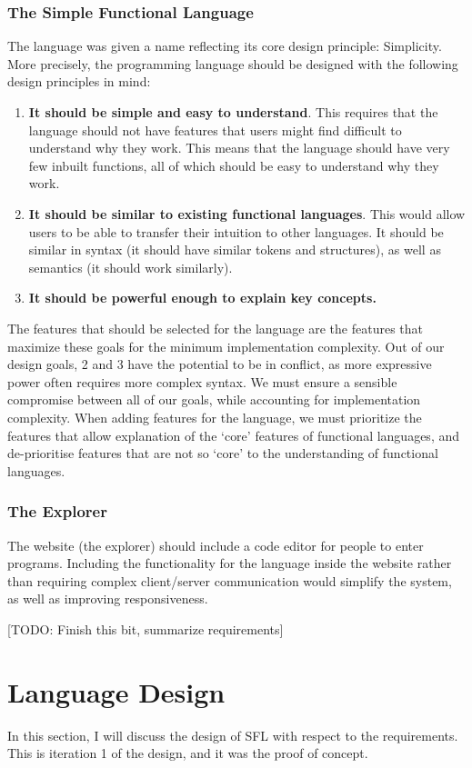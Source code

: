 \subsubsection{The Simple Functional Language}
\label{design:goals}
The language was given a name reflecting its core design principle: Simplicity. More precisely, the programming language should be designed with the following design principles in mind:
\begin{enumerate}
    \item \textbf{It should be simple and easy to understand}. This requires that the language should not have features that users might find difficult to understand why they work. This means that the language should have very few inbuilt functions, all of which should be easy to understand why they work. 
    \item \textbf{It should be similar to existing functional languages}. This would allow users to be able to transfer their intuition to other languages. It should be similar in syntax (it should have similar tokens and structures), as well as semantics (it should work similarly). 
    \item \textbf{It should be powerful enough to explain key concepts.}
\end{enumerate}
The features that should be selected for the language are the features that maximize these goals for the minimum implementation complexity. Out of our design goals, 2 and 3 have the potential to be in conflict, as more expressive power often requires more complex syntax. We must ensure a sensible compromise between all of our goals, while accounting for implementation complexity. When adding features for the language, we must prioritize the features that allow explanation of the `core' features of functional languages, and de-prioritise features that are not so `core' to the understanding of functional languages. 

\subsubsection{The Explorer}
The website (the explorer) should include a code editor for people to enter programs. Including the functionality for the language inside the website rather than requiring complex client/server communication would simplify the system, as well as improving responsiveness. 

[TODO: Finish this bit, summarize requirements]

\section{Language Design}
In this section, I will discuss the design of \ac{SFL} with respect to the requirements. This is iteration 1 of the design, and it was the proof of concept.  

